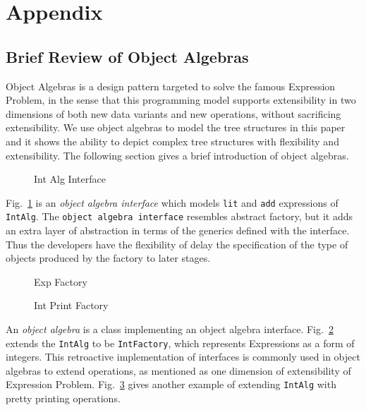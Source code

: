 \section{Appendix}\label{sec:appendix}

\clearpage
\subsection{Brief Review of Object Algebras}\label{subsec:ObjectAlgebras}

Object Algebras is a design pattern targeted to solve the famous Expression Problem, in the sense that this programming model supports extensibility in two dimensions of both new data variants and new operations, without sacrificing extensibility. We use object algebras to model the tree structures in this paper and it shows the ability to depict complex tree structures with flexibility and extensibility. The following section gives a brief introduction of object algebras.

\begin{figure}[t]
\nocaptionrule
\caption{Int Alg Interface}
\label{int_alg_interface}
\end{figure}

Fig.~\ref{int_alg_interface} is an \emph{object algebra interface} which models \lstinline{lit} and \lstinline{add} expressions of \lstinline{IntAlg}. The \lstinline{object algebra interface} resembles abstract factory, but it adds an extra layer of abstraction in terms of the generics defined with the interface. Thus the developers have the flexibility of delay the specification of the type of objects produced by the factory to later stages.

\begin{figure}[t]
\nocaptionrule
\caption{Exp Factory}
\label{exp_factory}
\end{figure}

\begin{figure}[t]
\nocaptionrule
\caption{Int Print Factory}
\label{int_print_factory}
\end{figure}

An \emph{object algebra} is a class implementing an object algebra interface. Fig.~\ref{exp_factory} extends the \lstinline{IntAlg} to be \lstinline{IntFactory}, which represents Expressions as a form of integers. This retroactive implementation of interfaces is commonly used in object algebras to extend operations, as mentioned as one dimension of extensibility of Expression Problem. Fig.~\ref{int_print_factory} gives another example of extending \lstinline{IntAlg} with pretty printing operations.

